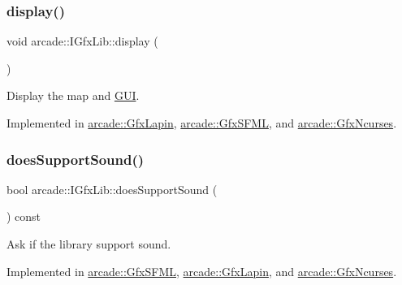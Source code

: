 \mbox{\label{classarcade_1_1_i_gfx_lib_a7f280525c718a44c1e05cfe0ba5304c3}} 
\subsubsection{\texorpdfstring{display()}{display()}}
{\footnotesize\ttfamily void arcade\+::\+I\+Gfx\+Lib\+::display (\begin{DoxyParamCaption}{ }\end{DoxyParamCaption})\hspace{0.3cm}{\ttfamily [pure virtual]}}



Display the map and \hyperlink{classarcade_1_1_g_u_i}{G\+UI}. 



Implemented in \hyperlink{classarcade_1_1_gfx_lapin_ac7c96886eb54a7d2f18e528e8f0c7ba1}{arcade\+::\+Gfx\+Lapin}, \hyperlink{classarcade_1_1_gfx_s_f_m_l_a590d6b932d5200a1367d8a2ff76def61}{arcade\+::\+Gfx\+S\+F\+ML}, and \hyperlink{classarcade_1_1_gfx_ncurses_aa119cdff68869bcd3829bb9fa9eaa373}{arcade\+::\+Gfx\+Ncurses}.

\mbox{\label{classarcade_1_1_i_gfx_lib_a68cfbc987dfecca5b1405e36e00157b2}} 
\subsubsection{\texorpdfstring{does\+Support\+Sound()}{doesSupportSound()}}
{\footnotesize\ttfamily bool arcade\+::\+I\+Gfx\+Lib\+::does\+Support\+Sound (\begin{DoxyParamCaption}{ }\end{DoxyParamCaption}) const\hspace{0.3cm}{\ttfamily [pure virtual]}}



Ask if the library support sound. 



Implemented in \hyperlink{classarcade_1_1_gfx_s_f_m_l_aa8d0f997c7ddcb68526e0f19f5bad77d}{arcade\+::\+Gfx\+S\+F\+ML}, \hyperlink{classarcade_1_1_gfx_lapin_ae84337d3ae5e24a61f160d3ac99d4e10}{arcade\+::\+Gfx\+Lapin}, and \hyperlink{classarcade_1_1_gfx_ncurses_ab100f60173ccd55f19c30627ace55101}{arcade\+::\+Gfx\+Ncurses}.

